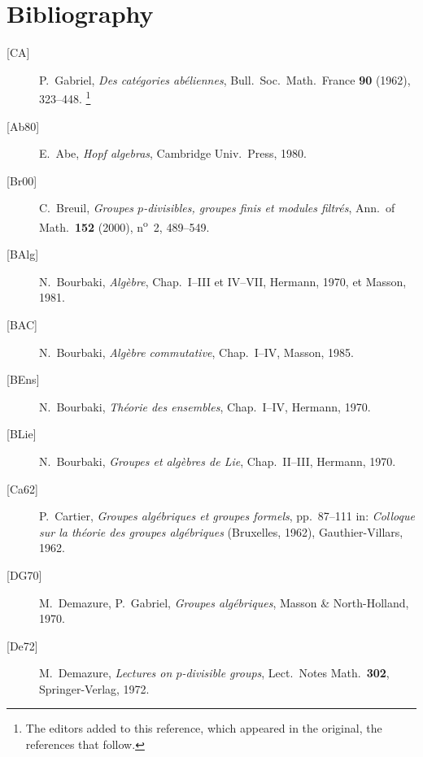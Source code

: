 
\chapter*{Bibliography}
\label{sga3:VIIB:bibliography}

\begin{description}
  \item[\textup{[CA]}] P.~Gabriel,
  \emph{Des cat\'egories ab\'eliennes},
  Bull.\ Soc.\ Math.\ France \textbf{90} (1962), 323--448.
  \footnote{\label{sga3:VIIB:nde:170}The editors added to this
  reference, which appeared in the original, the references that
  follow.}

  \item[\textup{[Ab80]}] E.~Abe,
  \emph{Hopf algebras}, Cambridge Univ.\ Press, 1980.

  \item[\textup{[Br00]}] C.~Breuil,
  \emph{Groupes \(p\)-divisibles, groupes finis et modules
  filtr\'es}, Ann.\ of Math.\ \textbf{152} (2000),
  n\textsuperscript{o}~2, 489--549.

  \item[\textup{[BAlg]}] N.~Bourbaki,
  \emph{Alg\`ebre}, Chap.\ I--III et IV--VII, Hermann, 1970,
  et Masson, 1981.

  \item[\textup{[BAC]}] N.~Bourbaki,
  \emph{Alg\`ebre commutative}, Chap.\ I--IV, Masson, 1985.

  \item[\textup{[BEns]}] N.~Bourbaki,
  \emph{Th\'eorie des ensembles}, Chap.\ I--IV, Hermann, 1970.

  \item[\textup{[BLie]}] N.~Bourbaki,
  \emph{Groupes et alg\`ebres de Lie}, Chap.\ II--III,
  Hermann, 1970.

  \item[\textup{[Ca62]}] P.~Cartier,
  \emph{Groupes alg\'ebriques et groupes formels}, pp.~87--111
  in: \emph{Colloque sur la th\'eorie des groupes alg\'ebriques}
  (Bruxelles, 1962), Gauthier-Villars, 1962.

  \item[\textup{[DG70]}] M.~Demazure, P.~Gabriel,
  \emph{Groupes alg\'ebriques}, Masson \& North-Holland, 1970.

  \item[\textup{[De72]}] M.~Demazure,
  \emph{Lectures on \(p\)-divisible groups},
  Lect.\ Notes Math.\ \textbf{302}, Springer-Verlag, 1972.


\end{description}
